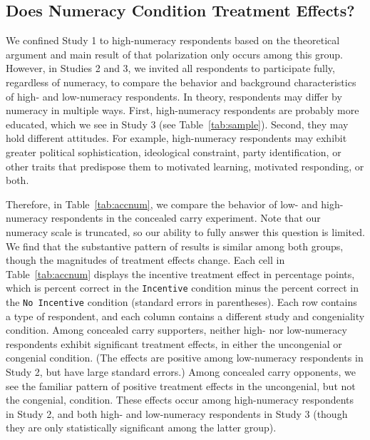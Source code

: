 \documentclass[12pt, letterpaper]{article}
\begin{document}
\subsection{Does Numeracy Condition Treatment Effects?}
\label{sec:numeracy}
\doublespacing

We confined Study 1 to high-numeracy respondents based on the theoretical argument and main result of \citet{kahan2017} that polarization only occurs among this group. However, in Studies 2 and 3, we invited all respondents to participate fully, regardless of numeracy, to compare the behavior and background characteristics of high- and low-numeracy respondents. In theory, respondents may differ by numeracy in multiple ways. First, high-numeracy respondents are probably more educated, which we see in Study 3 (see Table~\ref{tab:sample}). Second, they may hold different attitudes. For example, high-numeracy respondents may exhibit greater political sophistication, ideological constraint, party identification, or other traits that predispose them to motivated learning, motivated responding, or both.

Therefore, in Table~\ref{tab:accnum}, we compare the behavior of low- and high-numeracy respondents in the concealed carry experiment. Note that our numeracy scale is truncated, so our ability to fully answer this question is limited. We find that the substantive pattern of results is similar among both groups, though the magnitudes of treatment effects change. Each cell in Table~\ref{tab:accnum} displays the incentive treatment effect in percentage points, which is percent correct in the \texttt{Incentive} condition minus the percent correct in the \texttt{No Incentive} condition (standard errors in parentheses). Each row contains a type of respondent, and each column contains a different study and congeniality condition. Among concealed carry supporters, neither high- nor low-numeracy respondents exhibit significant treatment effects, in either the uncongenial or congenial condition. (The effects are positive among low-numeracy respondents in Study 2, but have large standard errors.) Among concealed carry opponents, we see the familiar pattern of positive treatment effects in the uncongenial, but not the congenial, condition. These effects occur among high-numeracy respondents in Study 2, and both high- and low-numeracy respondents in Study 3 (though they are only statistically significant among the latter group).
\end{document}
